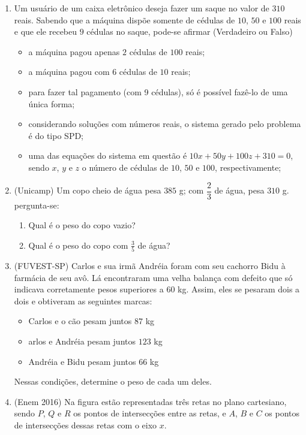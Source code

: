 \begin{enumerate}
\item Um usuário de um caixa eletrônico deseja fazer um saque no valor de $310$ reais. Sabendo que a máquina dispõe somente de cédulas de $10$, $50$ e $100$ reais e que ele recebeu $9$ cédulas no saque, pode-se afirmar (Verdadeiro ou Falso)
\begin{itemize}[label=({ }{ }{ })]
\item a máquina pagou apenas $2$ cédulas de $100$ reais;
\item a máquina pagou com $6$ cédulas de $10$ reais;
\item para fazer tal pagamento (com 9 cédulas), só é possível fazê-lo de uma única forma;
\item considerando soluções com números reais, o sistema gerado pelo problema é do tipo SPD;
\item uma das equações do sistema em questão é $10x + 50y + 100z + 310 = 0$, sendo $x$, $y$ e $z$ o número de cédulas de $10$, $50$ e $100$, respectivamente;
\end{itemize}


\item (Unicamp) Um copo cheio de água pesa $385$ g; com $\dfrac{2}{3}$ de água, pesa $310$ g. pergunta-se:
\begin{enumerate}
\item Qual é o peso do copo vazio?
\item Qual é o peso do copo com $\frac{3}{5}$ de água?
\end{enumerate}


\item (FUVEST-SP) Carlos e sua irmã Andréia foram com seu cachorro Bidu à farmácia de seu avô. Lá encontraram uma velha balança com defeito que só indicava corretamente pesos superiores a $60$ kg. Assim, eles se pesaram dois a dois e obtiveram as seguintes marcas:
\begin{itemize}
\item Carlos e o cão pesam juntos $87$ kg
\item arlos e Andréia pesam juntos $123$ kg
\item Andréia e Bidu pesam juntos $66$ kg
\end{itemize}
Nessas condições, determine o peso de cada um deles.

\clearpage
\item (Enem 2016) Na figura estão representadas três retas no plano cartesiano, sendo $P$, $Q$ e $R$ os pontos de intersecções entre as retas, e $A$, $B$ e $C$ os pontos de intersecções dessas retas com o eixo $x$.


\end{enumerate}
